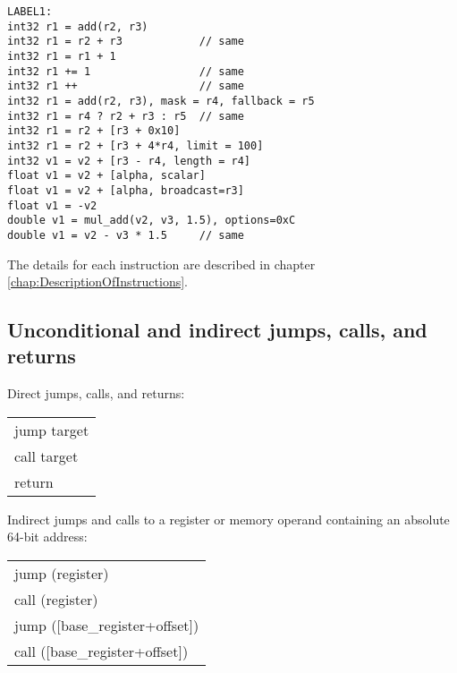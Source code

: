 \documentclass[forwardcom.tex]{subfiles}
\begin{document}
\begin{lstlisting}[frame=single]
LABEL1:
int32 r1 = add(r2, r3)
int32 r1 = r2 + r3            // same
int32 r1 = r1 + 1
int32 r1 += 1                 // same
int32 r1 ++                   // same
int32 r1 = add(r2, r3), mask = r4, fallback = r5
int32 r1 = r4 ? r2 + r3 : r5  // same
int32 r1 = r2 + [r3 + 0x10]
int32 r1 = r2 + [r3 + 4*r4, limit = 100]
int32 v1 = v2 + [r3 - r4, length = r4]
float v1 = v2 + [alpha, scalar]
float v1 = v2 + [alpha, broadcast=r3]
float v1 = -v2
double v1 = mul_add(v2, v3, 1.5), options=0xC
double v1 = v2 - v3 * 1.5     // same
\end{lstlisting}
\vspace{2mm}

The details for each instruction are described in chapter \ref{chap:DescriptionOfInstructions}.
\vspace{2mm}


\subsection{Unconditional and indirect jumps, calls, and returns} \label{assemblyJumps}
Direct jumps, calls, and  returns:
\vspace{2mm}

\begin{tabular}{|p{140mm}|}
\hline
\hspace{4mm} jump target\\
\hspace{4mm} call target\\
\hspace{4mm} return\\
\hline
\end{tabular}
\vspace{4mm}

Indirect jumps and calls to a register or memory operand containing an absolute 64-bit address:

\begin{tabular}{|p{140mm}|}
\hline
\hspace{4mm} jump (register)\\
\hspace{4mm} call (register)\\
\hspace{4mm} jump ([base\_register+offset])\\
\hspace{4mm} call ([base\_register+offset])\\
\hline
\end{tabular}
\vspace{4mm}
\end{document}
